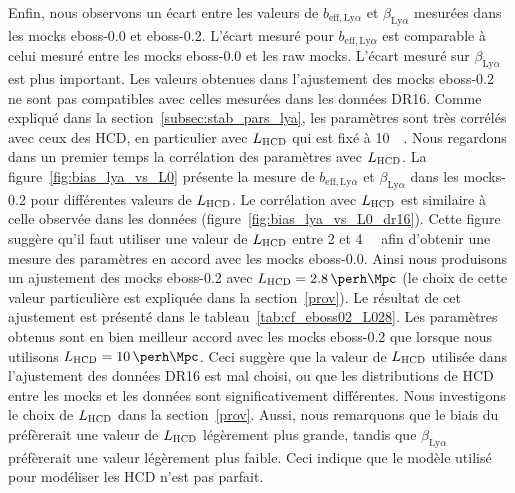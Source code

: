 \documentclass[11pt, twoside, a4paper, openright]{report}
\begin{document}
Enfin, nous observons un écart entre les valeurs de $b_{\mathrm{eff},\mathrm{Ly}\alpha}$ et $\beta_{\mathrm{Ly}\alpha}$ mesurées dans les mocks eboss-0.0 et eboss-0.2. L'écart mesuré pour $b_{\mathrm{eff},\mathrm{Ly}\alpha}$ est comparable à celui mesuré entre les mocks eboss-0.0 et les raw mocks.
L'écart mesuré sur $\beta_{\mathrm{Ly}\alpha}$ est plus important. Les valeurs obtenues dans l'ajustement des mocks eboss-0.2 ne sont pas compatibles avec celles mesurées dans les données DR16.
Comme expliqué dans la section~\ref{subsec:stab_pars_lya}, les paramètres \lya{} sont très corrélés avec ceux des HCD, en particulier avec $L_{\textsc{HCD}}$ qui est fixé à \SI{10}{\perh\Mpc}.
Nous regardons dans un premier temps la corrélation des paramètres \lya{} avec $L_{\textsc{HCD}}$. La figure~\ref{fig:bias_lya_vs_L0} présente la mesure de $b_{\mathrm{eff},\mathrm{Ly}\alpha}$ et $\beta_{\mathrm{Ly}\alpha}$ dans les mocks-0.2 pour différentes valeurs de $L_{\textsc{HCD}}$. Le corrélation avec $L_{\textsc{HCD}}$ est similaire à celle observée dans les données (figure~\ref{fig:bias_lya_vs_L0_dr16}).
Cette figure suggère qu'il faut utiliser une valeur de $L_{\textsc{HCD}}$ entre 2 et \SI{4}{\perh\Mpc} afin d'obtenir une mesure des paramètres \lya{} en accord avec les mocks eboss-0.0.
Ainsi nous produisons un ajustement des mocks eboss-0.2 avec $L_{\textsc{HCD}} = \SI{2.8}{\perh\Mpc}$ (le choix de cette valeur particulière est expliquée dans la section~\ref{prov}).
Le résultat de cet ajustement est présenté dans le tableau~\ref{tab:cf_eboss02_L028}.
Les paramètres \lya{} obtenus sont en bien meilleur accord avec les mocks eboss-0.2 que lorsque nous utilisons $L_{\textsc{HCD}} = \SI{10}{\perh\Mpc}$.
Ceci suggère que la valeur de $L_{\textsc{HCD}}$ utilisée dans l'ajustement des données DR16 est mal choisi, ou que les distributions de HCD entre les mocks et les données sont significativement différentes. Nous investigons le choix de $L_{\textsc{HCD}}$ dans la section~\ref{prov}.
Aussi, nous remarquons que le biais du \lya{} préfèrerait une valeur de $L_{\textsc{HCD}}$ légèrement plus grande, tandis que $\beta_{\mathrm{Ly}\alpha}$ préfèrerait une valeur légèrement plus faible. Ceci indique que le modèle utilisé pour modéliser les HCD n'est pas parfait.
\end{document}

